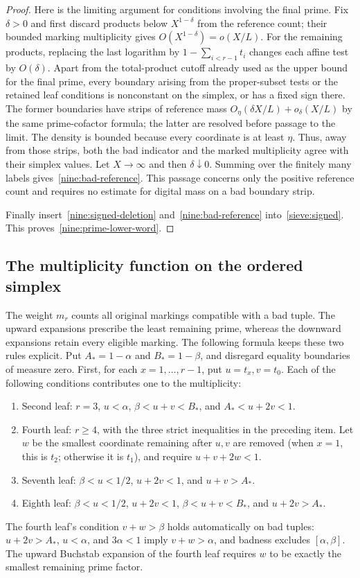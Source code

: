 \documentclass[11pt,a4paper]{article}
\theoremstyle{paperplain}
\numberwithin{equation}{section}
\begin{document}
\begin{proof}
Here is the limiting argument for conditions involving the final prime.
Fix $\delta>0$ and first discard products below $X^{1-\delta}$ from the
reference count; their bounded marking multiplicity gives
$O(X^{1-\delta})=o(X/L)$.
For the remaining products, replacing the last logarithm by
$1-\sum_{i<r-1}t_i$ changes each affine test by $O(\delta)$.
Apart from the total-product cutoff already used as the upper bound for
the final prime, every boundary arising from the proper-subset tests or
the retained leaf conditions is nonconstant on the simplex, or has a
fixed sign there.
The former boundaries have strips of reference mass
$O_\eta(\delta X/L)+o_\delta(X/L)$ by the same prime-cofactor formula;
the latter are resolved before passage to the limit.
The density is bounded because every coordinate is at least $\eta$.
Thus, away from those strips, both the bad indicator and the marked
multiplicity agree with their simplex values.
Let $X\to\infty$ and then $\delta\downarrow0$.
Summing over the finitely many labels gives~\eqref{nine:bad-reference}.
This passage concerns only the positive reference count and requires no
estimate for digital mass on a bad boundary strip.

Finally insert~\eqref{nine:signed-deletion} and~\eqref{nine:bad-reference}
into~\eqref{sieve:signed}. This proves~\eqref{nine:prime-lower-word}.
\end{proof}

\subsection{The multiplicity function on the ordered simplex}

The weight $m_r$ counts all original markings compatible with a bad tuple.
The upward expansions prescribe the least remaining prime, whereas the
downward expansions retain every eligible marking. The following formula
keeps these two rules explicit.
Put $A_*=1-\alpha$ and $B_*=1-\beta$, and disregard equality boundaries of measure
zero. First, for each $x=1,\ldots,r-1$, put $u=t_x,v=t_0$.
Each of the following conditions contributes one to the multiplicity:
\begin{enumerate}
 \item Second leaf: $r=3$, $u<\alpha$,
 $\beta<u+v<B_*$, and $A_*<u+2v<1$.
 \item Fourth leaf: $r\ge4$, with the three strict inequalities in the preceding
 item. Let $w$ be the smallest coordinate remaining after $u,v$ are removed
 (when $x=1$, this is $t_2$; otherwise it is $t_1$), and require $u+v+2w<1$.
 \item Seventh leaf: $\beta<u<1/2$, $u+2v<1$, and $u+v>A_*$.
 \item Eighth leaf: $\beta<u<1/2$, $u+2v<1$,
 $\beta<u+v<B_*$, and $u+2v>A_*$.
\end{enumerate}
The fourth leaf's condition $v+w>\beta$ holds automatically on bad tuples:
$u+2v>A_*$, $u<\alpha$, and $3\alpha<1$ imply $v+w>\alpha$,
and badness excludes $[\alpha,\beta]$.
The upward Buchstab expansion of the fourth leaf requires $w$ to be exactly
the smallest remaining prime factor.
\end{document}
